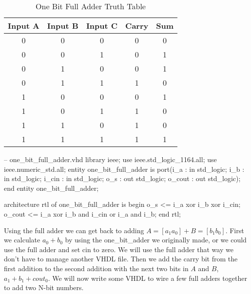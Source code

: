 \begin{table}[h!]  
\begin{center}    
\caption{One Bit Full Adder Truth Table} 
\label{tab:tt2bfa} 
\begin{tabular}{|c|c|c||c|c|}  
\textbf{Input A} & \textbf{Input B} & \textbf{Input C} & \textbf{Carry} & \textbf{Sum}\\  
\hline  
0 & 0 & 0 & 0 & 0\\  
0 & 0 & 1 & 0 & 1\\  
0 & 1 & 0 & 0 & 1\\  
0 & 1 & 1 & 1 & 0\\  
1 & 0 & 0 & 0 & 1\\  
1 & 0 & 1 & 1 & 0\\  
1 & 1 & 0 & 1 & 0\\  
1 & 1 & 1 & 1 & 1\\ 
\end{tabular}  
\end{center}
\end{table}

\begin{VHDLlisting}[tabsize=4]
-- one_bit_full_adder.vhd
library ieee; 
	use ieee.std_logic_1164.all; 
	use ieee.numeric_std.all; 
entity one_bit_full_adder is
port(i_a    : in    std_logic;  
	 i_b    : in    std_logic;  
	 i_cin  : in    std_logic;  
	 o_s    :   out std_logic;  
	 o_cout :   out std_logic);
end entity one_bit_full_adder;

architecture rtl of one_bit_full_adder is
begin 
	o_s <= i_a xor i_b xor i_cin; 
	o_cout <= i_a xor i_b and i_cin or i_a and i_b;
end rtl;
\end{VHDLlisting}

Using the full adder we can get back to adding $A=[a_1 a_0] + B=[b_1 b_0]$. First we calculate $a_0 + b_0$ by using the one\_bit\_adder we originally made, or we could use the full adder and set cin to zero. We will use the full adder that way we don't have to manage another \ac{VHDL} file. Then we add the carry bit from the first addition to the second addition with the next two bits in $A$ and $B$, $a_1 + b_1 + cout_0$. We will now write some \ac{VHDL} to wire a few full adders together to add two N-bit numbers.  

